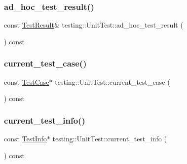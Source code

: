 \subsubsection{\texorpdfstring{ad\_hoc\_test\_result()}{ad\_hoc\_test\_result()}}
{\footnotesize\ttfamily const \mbox{\hyperlink{classtesting_1_1_test_result}{Test\+Result}}\& testing\+::\+Unit\+Test\+::ad\+\_\+hoc\+\_\+test\+\_\+result (\begin{DoxyParamCaption}{ }\end{DoxyParamCaption}) const}

\mbox{\label{classtesting_1_1_unit_test_a158da6213cf0b2c6100e9cb1f8151e63}} 
\subsubsection{\texorpdfstring{current\_test\_case()}{current\_test\_case()}}
{\footnotesize\ttfamily const \mbox{\hyperlink{classtesting_1_1_test_case}{Test\+Case}}$\ast$ testing\+::\+Unit\+Test\+::current\+\_\+test\+\_\+case (\begin{DoxyParamCaption}{ }\end{DoxyParamCaption}) const}

\mbox{\label{classtesting_1_1_unit_test_a02b6ab72bb9d93805bd0efbb099b4ccc}} 
\subsubsection{\texorpdfstring{current\_test\_info()}{current\_test\_info()}}
{\footnotesize\ttfamily const \mbox{\hyperlink{classtesting_1_1_test_info}{Test\+Info}}$\ast$ testing\+::\+Unit\+Test\+::current\+\_\+test\+\_\+info (\begin{DoxyParamCaption}{ }\end{DoxyParamCaption}) const}

\mbox{\label{classtesting_1_1_unit_test_ad69ccf3d4a9bc7333badeafbde3bc76b}} 
